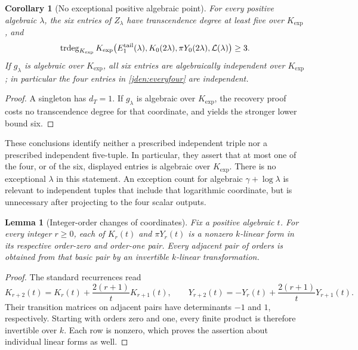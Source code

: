 \documentclass[11pt]{article}
\newtheorem{corollary}[theorem]{Corollary}
\newtheorem{lemma}[theorem]{Lemma}
\theoremstyle{definition}
\theoremstyle{remark}
\newcommand{\trdeg}{\operatorname{trdeg}}
\newcommand{\Kexp}{K_{\mathrm{exp}}}
\begin{document}
\begin{corollary}[No exceptional positive algebraic point]
\label{jden:everypoint}
For every positive algebraic $\lambda$, the six entries of
$Z_\lambda$ have transcendence degree at least five over $\Kexp$,
and
\begin{equation}\label{jden:everyfour}
 \trdeg_{\Kexp}\Kexp
 \bigl(E_1^{\rm tail}(\lambda),K_0(2\lambda),
             \pi Y_0(2\lambda),\mathcal L(\lambda)\bigr)\ge3.
\end{equation}
If $g_\lambda$ is algebraic over $\Kexp$, all six entries are
algebraically independent over $\Kexp$; in particular the four
entries in \eqref{jden:everyfour} are independent.
\end{corollary}

\begin{proof}
A singleton has $d_T=1$. If $g_\lambda$ is algebraic over $\Kexp$,
the recovery proof costs no transcendence degree for that coordinate,
and yields the stronger lower bound six.
\end{proof}

These conclusions identify neither a prescribed independent triple nor
a prescribed independent five-tuple. In particular, they assert that
at most one of the four, or of the six, displayed entries is algebraic
over $\Kexp$. There is no exceptional $\lambda$ in this statement.
An exception count for algebraic $\gamma+\log\lambda$ is relevant to
independent tuples that include that logarithmic coordinate, but is
unnecessary after projecting to the four scalar outputs.

\begin{lemma}[Integer-order changes of coordinates]\label{jden:orders}
Fix a positive algebraic $t$. For every integer $r\ge0$, each of
$K_r(t)$ and $\pi Y_r(t)$ is a nonzero $k$-linear form in its
respective order-zero and order-one pair. Every adjacent pair of
orders is obtained from that basic pair by an invertible $k$-linear
transformation.
\end{lemma}

\begin{proof}
The standard recurrences \cite[\S\S10.6, 10.29]{DLMF} read
\[
 K_{r+2}(t)=K_r(t)+\frac{2(r+1)}tK_{r+1}(t),\qquad
 Y_{r+2}(t)=-Y_r(t)+\frac{2(r+1)}tY_{r+1}(t).
\]
Their transition matrices on adjacent pairs have determinants $-1$
and $1$, respectively. Starting with orders zero and one, every
finite product is therefore invertible over $k$. Each row is nonzero,
which proves the assertion about individual linear forms as well.
\end{proof}
\end{document}
